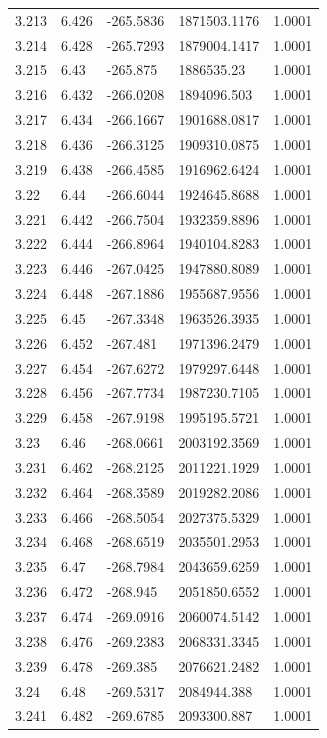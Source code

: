 \begin{tabular}{lllll}
3.213 & 6.426 & -265.5836 & 1871503.1176 & 1.0001 \\
3.214 & 6.428 & -265.7293 & 1879004.1417 & 1.0001 \\
3.215 & 6.43 & -265.875 & 1886535.23 & 1.0001 \\
3.216 & 6.432 & -266.0208 & 1894096.503 & 1.0001 \\
3.217 & 6.434 & -266.1667 & 1901688.0817 & 1.0001 \\
3.218 & 6.436 & -266.3125 & 1909310.0875 & 1.0001 \\
3.219 & 6.438 & -266.4585 & 1916962.6424 & 1.0001 \\
3.22 & 6.44 & -266.6044 & 1924645.8688 & 1.0001 \\
3.221 & 6.442 & -266.7504 & 1932359.8896 & 1.0001 \\
3.222 & 6.444 & -266.8964 & 1940104.8283 & 1.0001 \\
3.223 & 6.446 & -267.0425 & 1947880.8089 & 1.0001 \\
3.224 & 6.448 & -267.1886 & 1955687.9556 & 1.0001 \\
3.225 & 6.45 & -267.3348 & 1963526.3935 & 1.0001 \\
3.226 & 6.452 & -267.481 & 1971396.2479 & 1.0001 \\
3.227 & 6.454 & -267.6272 & 1979297.6448 & 1.0001 \\
3.228 & 6.456 & -267.7734 & 1987230.7105 & 1.0001 \\
3.229 & 6.458 & -267.9198 & 1995195.5721 & 1.0001 \\
3.23 & 6.46 & -268.0661 & 2003192.3569 & 1.0001 \\
3.231 & 6.462 & -268.2125 & 2011221.1929 & 1.0001 \\
3.232 & 6.464 & -268.3589 & 2019282.2086 & 1.0001 \\
3.233 & 6.466 & -268.5054 & 2027375.5329 & 1.0001 \\
3.234 & 6.468 & -268.6519 & 2035501.2953 & 1.0001 \\
3.235 & 6.47 & -268.7984 & 2043659.6259 & 1.0001 \\
3.236 & 6.472 & -268.945 & 2051850.6552 & 1.0001 \\
3.237 & 6.474 & -269.0916 & 2060074.5142 & 1.0001 \\
3.238 & 6.476 & -269.2383 & 2068331.3345 & 1.0001 \\
3.239 & 6.478 & -269.385 & 2076621.2482 & 1.0001 \\
3.24 & 6.48 & -269.5317 & 2084944.388 & 1.0001 \\
3.241 & 6.482 & -269.6785 & 2093300.887 & 1.0001 \\

\end{tabular}
